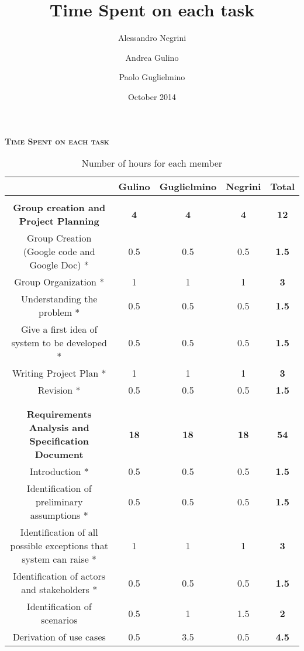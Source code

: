 \documentclass[a4paper]{article}
\title{Time Spent on each task}
\author{Alessandro Negrini \and Andrea Gulino \and Paolo Guglielmino}
\date{October 2014}
\begin{document}
\thispagestyle{empty}
\pagestyle{empty} 

	\begin{center}
		\textsc{\textbf{\huge{Time Spent on each task }}}\\ \medskip	
	\end{center}
	
	\begin{table}[ht]
		\caption{Number of hours for each member} %
		\vspace{1cm}
		\centering %
		\begin{tabular}{c c c c c} %
		\hline\hline %
			       & Gulino & Guglielmino & Negrini & \textbf{Total} \\ [0.5ex] %
		\hline %
		\tabularnewline
		\textbf{Group creation and Project Planning} & \textbf{4} & \textbf{4} & \textbf{4} & \textbf{12}  \\ %
		Group Creation (Google code and Google Doc) * & 0.5 & 0.5 & 0.5 & \textbf{1.5}\\
		Group Organization * & 1 & 1 & 1 &\textbf{3}\\
		Understanding the problem *   & 0.5 & 0.5 & 0.5 & \textbf{1.5}\\
		Give a first idea of system to be developed * & 0.5 & 0.5 & 0.5 & \textbf{1.5}\\  %
		Writing Project Plan * & 1 & 1 & 1 & \textbf{3}\\
		Revision * & 0.5 & 0.5 & 0.5 & \textbf{1.5}\\ [1ex]
		\tabularnewline
		\hline %
		\tabularnewline
		\textbf{Requirements Analysis and Specification Document } & \textbf{18} & \textbf{18} & \textbf{18} &  \textbf{54}\\ %
		Introduction *   & 0.5 & 0.5 & 0.5 & \textbf{1.5}\\
		Identification of preliminary assumptions *   & 0.5 & 0.5 & 0.5 & \textbf{1.5} \\
		Identification of all possible exceptions that system can raise *   & 1 & 1 & 1 & \textbf{3}\\
		Identification of actors and stakeholders * & 0.5 & 0.5 & 0.5 & \textbf{1.5}\\
		Identification of scenarios   & 0.5 & 1 & 1.5 & \textbf{2}\\
		Derivation of use cases   & 0.5 & 3.5 & 0.5 & \textbf{4.5}\\

\end{tabular}
\end{table}
\end{document}

